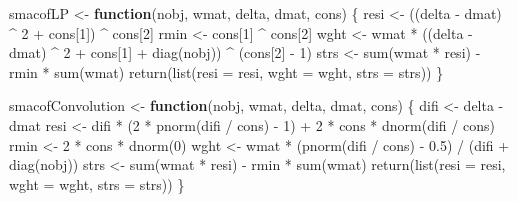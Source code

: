 \documentclass[
  12pt,
  letterpaper,
  DIV=11,
  numbers=noendperiod]{scrartcl}
\newenvironment{Shaded}{\begin{snugshade}}{\end{snugshade}}
\newcommand{\AttributeTok}[1]{\textcolor[rgb]{0.40,0.45,0.13}{#1}}
\newcommand{\ControlFlowTok}[1]{\textcolor[rgb]{0.00,0.23,0.31}{\textbf{#1}}}
\newcommand{\DecValTok}[1]{\textcolor[rgb]{0.68,0.00,0.00}{#1}}
\newcommand{\FloatTok}[1]{\textcolor[rgb]{0.68,0.00,0.00}{#1}}
\newcommand{\FunctionTok}[1]{\textcolor[rgb]{0.28,0.35,0.67}{#1}}
\newcommand{\NormalTok}[1]{\textcolor[rgb]{0.00,0.23,0.31}{#1}}
\newcommand{\OtherTok}[1]{\textcolor[rgb]{0.00,0.23,0.31}{#1}}
\newcommand{\SpecialCharTok}[1]{\textcolor[rgb]{0.37,0.37,0.37}{#1}}
\theoremstyle{plain}
\theoremstyle{remark}
\begin{document}
\begin{Shaded}
\begin{Highlighting}[]
\NormalTok{smacofLP }\OtherTok{\textless{}{-}} \ControlFlowTok{function}\NormalTok{(nobj, wmat, delta, dmat, cons) \{}
\NormalTok{  resi }\OtherTok{\textless{}{-}}\NormalTok{ ((delta }\SpecialCharTok{{-}}\NormalTok{ dmat) }\SpecialCharTok{\^{}} \DecValTok{2} \SpecialCharTok{+}\NormalTok{ cons[}\DecValTok{1}\NormalTok{]) }\SpecialCharTok{\^{}}\NormalTok{ cons[}\DecValTok{2}\NormalTok{]}
\NormalTok{  rmin }\OtherTok{\textless{}{-}}\NormalTok{ cons[}\DecValTok{1}\NormalTok{] }\SpecialCharTok{\^{}}\NormalTok{ cons[}\DecValTok{2}\NormalTok{]}
\NormalTok{  wght }\OtherTok{\textless{}{-}}\NormalTok{ wmat }\SpecialCharTok{*}\NormalTok{ ((delta }\SpecialCharTok{{-}}\NormalTok{ dmat) }\SpecialCharTok{\^{}} \DecValTok{2} \SpecialCharTok{+}\NormalTok{ cons[}\DecValTok{1}\NormalTok{] }\SpecialCharTok{+} \FunctionTok{diag}\NormalTok{(nobj)) }\SpecialCharTok{\^{}}\NormalTok{ (cons[}\DecValTok{2}\NormalTok{] }\SpecialCharTok{{-}} \DecValTok{1}\NormalTok{)}
\NormalTok{  strs }\OtherTok{\textless{}{-}} \FunctionTok{sum}\NormalTok{(wmat }\SpecialCharTok{*}\NormalTok{ resi) }\SpecialCharTok{{-}}\NormalTok{ rmin }\SpecialCharTok{*} \FunctionTok{sum}\NormalTok{(wmat)}
  \FunctionTok{return}\NormalTok{(}\FunctionTok{list}\NormalTok{(}\AttributeTok{resi =}\NormalTok{ resi, }\AttributeTok{wght =}\NormalTok{ wght, }\AttributeTok{strs =}\NormalTok{ strs))}
\NormalTok{\}}

\NormalTok{smacofConvolution }\OtherTok{\textless{}{-}} \ControlFlowTok{function}\NormalTok{(nobj, wmat, delta, dmat, cons) \{}
\NormalTok{  difi }\OtherTok{\textless{}{-}}\NormalTok{ delta }\SpecialCharTok{{-}}\NormalTok{ dmat}
\NormalTok{  resi }\OtherTok{\textless{}{-}}\NormalTok{ difi }\SpecialCharTok{*}\NormalTok{ (}\DecValTok{2} \SpecialCharTok{*} \FunctionTok{pnorm}\NormalTok{(difi }\SpecialCharTok{/}\NormalTok{ cons) }\SpecialCharTok{{-}} \DecValTok{1}\NormalTok{) }\SpecialCharTok{+} \DecValTok{2} \SpecialCharTok{*}\NormalTok{ cons }\SpecialCharTok{*} \FunctionTok{dnorm}\NormalTok{(difi }\SpecialCharTok{/}\NormalTok{ cons)}
\NormalTok{  rmin }\OtherTok{\textless{}{-}} \DecValTok{2} \SpecialCharTok{*}\NormalTok{ cons }\SpecialCharTok{*} \FunctionTok{dnorm}\NormalTok{(}\DecValTok{0}\NormalTok{)}
\NormalTok{  wght }\OtherTok{\textless{}{-}}\NormalTok{ wmat }\SpecialCharTok{*}\NormalTok{ (}\FunctionTok{pnorm}\NormalTok{(difi }\SpecialCharTok{/}\NormalTok{ cons) }\SpecialCharTok{{-}} \FloatTok{0.5}\NormalTok{) }\SpecialCharTok{/}\NormalTok{ (difi }\SpecialCharTok{+} \FunctionTok{diag}\NormalTok{(nobj))}
\NormalTok{  strs }\OtherTok{\textless{}{-}} \FunctionTok{sum}\NormalTok{(wmat }\SpecialCharTok{*}\NormalTok{ resi) }\SpecialCharTok{{-}}\NormalTok{ rmin }\SpecialCharTok{*} \FunctionTok{sum}\NormalTok{(wmat)}
  \FunctionTok{return}\NormalTok{(}\FunctionTok{list}\NormalTok{(}\AttributeTok{resi =}\NormalTok{ resi, }\AttributeTok{wght =}\NormalTok{ wght, }\AttributeTok{strs =}\NormalTok{ strs))}
\NormalTok{\}}


\end{Highlighting}
\end{Shaded}
\end{document}
